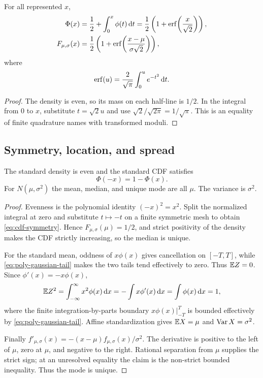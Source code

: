 \begin{corollary}\label{cor:cdf-erf}
For all represented $x$,
\begin{align}
 \Phi(x)&=\frac12+\int_0^x\phi(t)\,\mathrm d t
      =\frac12\left(1+\operatorname{erf}\!\left(\frac{x}{\sqrt2}\right)\right),\label{eq:cdf-erf}\\
 F_{\mu,\sigma}(x)&=\frac12\left(1+\operatorname{erf}\!\left(\frac{x-\mu}{\sigma\sqrt2}\right)\right),
\end{align}
where
\[
 \operatorname{erf}(u)=\frac2{\sqrt\pi}\int_0^u e^{-t^2}\,\mathrm d t.
\]
\end{corollary}

\begin{proof}
The density is even, so its mass on each half-line is $1/2$.  In the integral from $0$ to $x$, substitute $t=\sqrt2u$ and use $\sqrt2/\sqrt{2\pi}=1/\sqrt\pi$.  This is an equality of finite quadrature names with transformed moduli.
\end{proof}

\subsection{Symmetry, location, and spread}

\begin{theorem}\label{thm:centers}
The standard density is even and the standard CDF satisfies
\begin{equation}\label{eq:cdf-symmetry}
 \Phi(-x)=1-\Phi(x).
\end{equation}
For $N(\mu,\sigma^2)$ the mean, median, and unique mode are all $\mu$.  The variance is $\sigma^2$.
\end{theorem}

\begin{proof}
Evenness is the polynomial identity $(-x)^2=x^2$.  Split the normalized integral at zero and substitute $t\mapsto-t$ on a finite symmetric mesh to obtain \eqref{eq:cdf-symmetry}.  Hence $F_{\mu,\sigma}(\mu)=1/2$, and strict positivity of the density makes the CDF strictly increasing, so the median is unique.

For the standard mean, oddness of $x\phi(x)$ gives cancellation on $[-T,T]$, while \eqref{eq:poly-gaussian-tail} makes the two tails tend effectively to zero.  Thus $\mathbb E Z=0$.  Since $\phi'(x)=-x\phi(x)$,
\[
 \mathbb E Z^2=\int_{-\infty}^{\infty}x^2\phi(x)\,\mathrm d x
 =-\int x\phi'(x)\,\mathrm d x
 =\int\phi(x)\,\mathrm d x=1,
\]
where the finite integration-by-parts boundary $x\phi(x)|_{-T}^T$ is bounded effectively by \eqref{eq:poly-gaussian-tail}.  Affine standardization gives $\mathbb E X=\mu$ and $\operatorname{Var} X=\sigma^2$.

Finally $f'_{\mu,\sigma}(x)=-(x-\mu)f_{\mu,\sigma}(x)/\sigma^2$.  The derivative is positive to the left of $\mu$, zero at $\mu$, and negative to the right.  Rational separation from $\mu$ supplies the strict sign; at an unresolved equality the claim is the non-strict bounded inequality.  Thus the mode is unique.
\end{proof}

